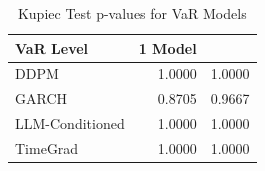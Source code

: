 \begin{table}
\caption{Kupiec Test p-values for VaR Models}
\label{tab:kupiec_pvalues}
\begin{tabular}{lrr}
\toprule
VaR Level & 1%
Model &  &  \\
\midrule
DDPM & 1.0000 & 1.0000 \\
GARCH & 0.8705 & 0.9667 \\
LLM-Conditioned & 1.0000 & 1.0000 \\
TimeGrad & 1.0000 & 1.0000 \\
\bottomrule
\end{tabular}
\end{table}
